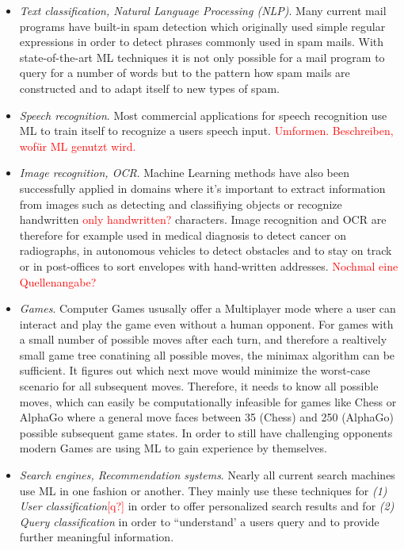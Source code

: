 \documentclass[conference,compsoc]{IEEEtran}
\newcommand\notes[1]{\textcolor{red}{#1}}
\begin{document}
\begin{itemize}
    \item \textit{Text classification, Natural Language Processing (NLP)}. 
        Many current mail programs have built-in spam detection which originally used
        simple regular expressions in order to detect phrases commonly used in spam mails.
        With state-of-the-art ML techniques it is not only possible for a mail program to 
        query for a number of words but to the pattern how spam mails are constructed and 
        to adapt itself to new types of spam.
    \item \textit{Speech recognition}. 
        Most commercial applications for speech recognition use ML to train itself to 
        recognize a users speech input. \notes{Umformen. Beschreiben, wofür ML genutzt wird.}
    \item \textit{Image recognition, OCR}.
        Machine Learning methods have also been successfully applied in domains where it's 
        important to extract information from images such as detecting and classifiying 
        objects or recognize handwritten \notes{only handwritten?} characters. Image 
        recognition and OCR are therefore for example used in medical diagnosis to 
        detect cancer on radiographs, in autonomous vehicles to detect obstacles and to 
        stay on track or in post-offices to sort envelopes with hand-written addresses. 
        \notes{Nochmal eine Quellenangabe?}
    \item \textit{Games}.
        Computer Games ususally offer a Multiplayer mode where a user can interact and 
        play the game even without a human opponent. For games with a small number of 
        possible moves after each turn, and therefore a realtively small game tree conatining 
        all possible moves, the minimax algorithm\cite{Prog2:bachmaier} can be sufficient. 
        It figures out which next move would minimize the worst-case scenario for all subsequent 
        moves. Therefore, it needs to know all possible moves, which can easily be computationally 
        infeasible for games like Chess or AlphaGo where a general move faces between 35 (Chess) and 
        250 (AlphaGo) possible subsequent game states.
        In order to still have challenging opponents modern Games are using ML to gain experience 
        by themselves.
    \item \textit{Search engines, Recommendation systems}.
        Nearly all current search machines use ML in one fashion or another. They mainly use these 
        techniques for \textit{(1) User classification}\notes{[q?]} in order to offer personalized 
        search results and for \textit{(2) Query classification} in order to ``understand' a 
        users query and to provide further meaningful information.
\end{itemize}
\end{document}
